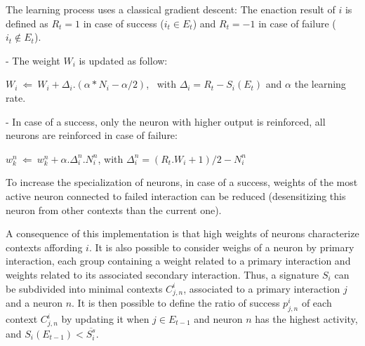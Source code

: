 \documentclass[conference]{IEEEtran}
\begin{document}
The learning process uses a classical gradient descent:
The enaction result of $i$ is defined as $R_t=1$ in case of success ($i_t \in E_t$) and $R_t=-1$ in case of failure ($i_t \not\in E_t$).

- The weight $W_i$ is updated as follow:

$W_i ~\Leftarrow~ W_i+ \Delta_i . (\alpha * N_i - \alpha /2)$, ~with $\Delta_i=R_t-S_i(E_t)$
and $\alpha$ the learning rate.

- In case of a success, only the neuron with higher output is reinforced, all neurons are reinforced in case of failure:

$w_k^n ~\Leftarrow~ w_k^n+ \alpha . \Delta_i^n . N_i^n$,
with $\Delta_i^n=(R_t.W_i + 1)/2 - N_i^n$


To increase the specialization of neurons, in case of a success, weights of the most active neuron connected to failed interaction can be reduced (desensitizing this neuron from other contexts than the current one). %


A consequence of this implementation is that high weights of neurons characterize contexts affording $i$. It is also possible to consider weighs of a neuron by primary interaction, each group containing a weight related to a primary interaction and weights related to its associated secondary interaction. Thus, a signature $S_i$ can be subdivided into minimal contexts $C_{j,n}^i$, associated to a primary interaction $j$ and a neuron $n$. It is then possible to define the ratio of success $p_{j,n}^i$ %
of each context $C_{j,n}^i$ by updating it when $j \in E_{t-1}$ and neuron $n$ has the highest activity, and $S_i(E_{t-1})<\overline{S_i^s}$.%
\end{document}
